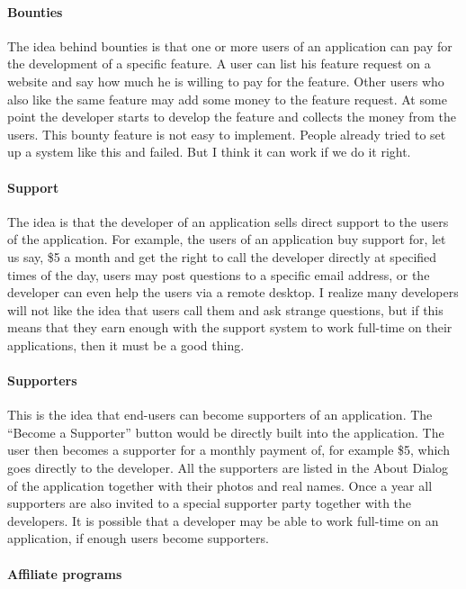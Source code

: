 \paragraph*{Bounties}

The idea behind bounties is that one or more users of an application can pay for
the development of a specific feature. A user can list his feature request on a
website and say how much he is willing to pay for the feature. Other users who
also like the same feature may add some money to the feature request. At some
point the developer starts to develop the feature and collects the money from
the users. This bounty feature is not easy to implement. People already tried to
set up a system like this and failed. But I think it can work if we do it
right. 

\paragraph*{Support}

The idea is that the developer of an application sells direct support to the
users of the application. For example, the users of an application buy support
for, let us say, \$5 a month and get the right to call the developer directly at
specified times of the day, users may post questions to a specific email
address, or the developer can even help the users via a remote desktop. I
realize many developers will not like the idea that users call them and ask
strange questions, but if this means that they earn enough with the support
system to work full-time on their applications, then it must be a good thing.

\paragraph*{Supporters}

This is the idea that end-users can become supporters of an application. The
``Become a Supporter'' button would be directly built into the application. The
user then becomes a supporter for a monthly payment of, for example \$5, which
goes directly to the developer. All the supporters are listed in the About
Dialog of the application together with their photos and real names. Once a year
all supporters are also invited to a special supporter party together with the
developers. It is possible that a developer may be able to work full-time on an
application, if enough users become supporters.

\paragraph*{Affiliate programs}

